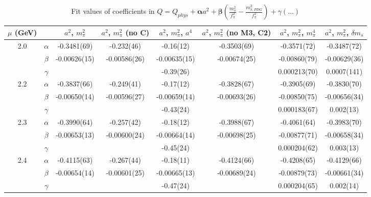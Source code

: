 \documentclass[12pt]{extarticle}
\begin{document}
\begin{table}[h!]
\begin{center}
\begin{tabular}{|c c|c|c|c|c|c|c|}
\hline
$\mu$ (GeV) &  & $a^2$, $m_\pi^2$& $a^2$, $m_\pi^2$ (no C)& $a^2$, $m_\pi^2$, $a^4$& $a^2$, $m_\pi^2$ (no M3, C2)& $a^2$, $m_\pi^2$, $m_\pi^4$& $a^2$, $m_\pi^2$, $\delta m_s$\\
\hline
\multirow{3}{0.5in}{2.0} & $\alpha$ & -0.3481(69)& -0.232(46)& -0.16(12)& -0.3503(69)& -0.3571(72)& -0.3487(72)\\
 & $\beta$ & -0.00626(15)& -0.00586(26)& -0.00635(15)& -0.00674(25)& -0.00860(79)& -0.00629(36)\\
 & $\gamma$ &  &  & -0.39(26)&  & 0.000213(70)& 0.0007(141)\\
\hline
\multirow{3}{0.5in}{2.2} & $\alpha$ & -0.3837(66)& -0.249(41)& -0.17(12)& -0.3828(67)& -0.3905(69)& -0.3830(70)\\
 & $\beta$ & -0.00650(14)& -0.00596(27)& -0.00659(14)& -0.00693(26)& -0.00850(75)& -0.00656(34)\\
 & $\gamma$ &  &  & -0.43(24)&  & 0.000183(67)& 0.002(13)\\
\hline
\multirow{3}{0.5in}{2.3} & $\alpha$ & -0.3990(64)& -0.257(42)& -0.18(12)& -0.3988(67)& -0.4061(64)& -0.3983(70)\\
 & $\beta$ & -0.00653(13)& -0.00600(24)& -0.00664(14)& -0.00698(25)& -0.00877(71)& -0.00658(34)\\
 & $\gamma$ &  &  & -0.45(24)&  & 0.000204(62)& 0.003(13)\\
\hline
\multirow{3}{0.5in}{2.4} & $\alpha$ & -0.4115(63)& -0.267(44)& -0.18(11)& -0.4124(66)& -0.4208(65)& -0.4129(66)\\
 & $\beta$ & -0.00654(14)& -0.00601(25)& -0.00665(13)& -0.00689(24)& -0.00879(73)& -0.00661(34)\\
 & $\gamma$ &  &  & -0.47(24)&  & 0.000204(65)& 0.002(14)\\
\hline
\end{tabular}
\caption{Fit values of coefficients in $Q = Q_{phys} + \mathbf{\alpha} a^2 + \mathbf{\beta}\left(\frac{m_\pi^2}{f_\pi^2}-\frac{m_{\pi,PDG}^2}{f_\pi^2}\right) + \gamma(\ldots)$}
\end{center}
\end{table}





\end{document}
